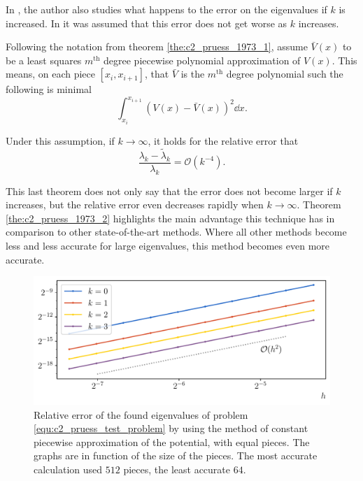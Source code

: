 In \cite{pruess_estimating_1973}, the author also studies what happens to the error on the eigenvalues if $k$ is increased. In \cite{canosa_new_1970} it was assumed that this error does not get worse as $k$ increases.

\begin{theorem}[Pruess 1973]\label{the:c2_pruess_1973_2}
    Following the notation from theorem \ref{the:c2_pruess_1973_1}, assume $\bar{V}(x)$ to be a least squares $m^\text{th}$ degree piecewise polynomial approximation of $V(x)$. This means, on each piece $[x_i, x_{i+1}]$, that $\bar{V}$ is the $m^\text{th}$ degree polynomial such the following is minimal
    $$
    \int_{x_i}^{x_{i+1}} \left(V(x) - \bar{V}(x)\right)^2 \dd x \text{.}
    $$
    
    Under this assumption, if $k \to \infty$, it holds for the relative error that
    $$
    \frac{\lambda_k - \tilde{\lambda}_k}{\lambda_k} = \mathcal{O}(k^{-4})\text{.}
    $$
\end{theorem}

This last theorem does not only say that the error does not become larger if $k$ increases, but the relative error even decreases rapidly when $k \to \infty$. Theorem \ref{the:c2_pruess_1973_2} highlights the main advantage this technique has in comparison to other state-of-the-art methods. Where all other methods become less and less accurate for large eigenvalues, this method becomes even more accurate.

\begin{figure}
    \begin{center}
        \includegraphics[width=\textwidth]{img/chapter2/pruess_h_error.pdf}
    \end{center}
    \caption{Relative error of the found eigenvalues of problem \eqref{equ:c2_pruess_test_problem} by using the method of constant piecewise approximation of the potential, with equal pieces. The graphs are in function of the size of the pieces. The most accurate calculation used $512$ pieces, the least accurate $64$.}
    \label{fig:c2_pruess_h_error}
\end{figure}

